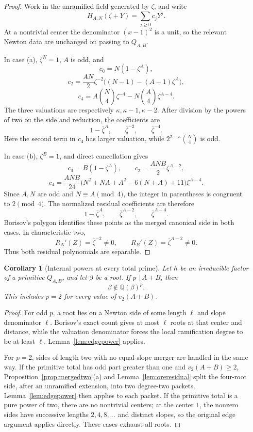 \documentclass[11pt]{article}
\newtheorem{corollary}[theorem]{Corollary}
\theoremstyle{definition}
\newcommand{\Q}{\mathbb Q}
\begin{document}
\begin{proof}
Work in the unramified field generated by \(\zeta\), and write
\[
 H_{A,N}(\zeta+Y)=\sum_{j\geq0}c_jY^j.
\]
At a nontrivial center the denominator \((x-1)^2\) is a unit, so the
relevant Newton data are unchanged on passing to \(Q_{A,B}\).

In case (a), \(\zeta^N=1\), \(A\) is odd, and
\[
 c_0=N(1-\zeta^A),
\]
\[
 c_2=\frac{AN}{2}\zeta^{-2}
       \bigl((N-1)-(A-1)\zeta^A\bigr),
\]
\[
 c_4=A\binom N4\zeta^{-4}
      -N\binom A4\zeta^{A-4}.
\]
The three valuations are respectively
\(\kappa,\kappa-1,\kappa-2\).  After division by the powers of two on the
side and reduction, the coefficients are
\[
 1-\bar\zeta^A,
 \qquad \bar\zeta^{-2},
 \qquad \bar\zeta^{-4}.
\]
Here the second term in \(c_4\) has larger valuation, while
\(2^{2-\kappa}\binom N4\) is odd.

In case (b), \(\zeta^B=1\), and direct cancellation gives
\[
 c_0=B(1-\zeta^A),
 \qquad
 c_2=\frac{ANB}{2}\zeta^{A-2},
\]
\[
 c_4=\frac{ANB}{24}
 \bigl(N^2+NA+A^2-6(N+A)+11\bigr)\zeta^{A-4}.
\]
Since \(A,N\) are odd and \(N\equiv A\pmod4\), the integer in parentheses
is congruent to \(2\pmod4\).  The normalized residual coefficients are
therefore
\[
 1-\bar\zeta^A,
 \qquad \bar\zeta^{A-2},
 \qquad \bar\zeta^{A-4}.
\]
Borisov's polygon identifies these points as the merged canonical side in
both cases.  In characteristic two,
\[
 R_N'(Z)=\bar\zeta^{-2}\neq0,
 \qquad
 R_B'(Z)=\bar\zeta^{A-2}\neq0.
\]
Thus both residual polynomials are separable.
\end{proof}

\begin{corollary}[Internal powers at every total prime]
\label{cor:totalprimepower}
Let \(h\) be an irreducible factor of a primitive \(Q_{A,B}\), and let
\(\beta\) be a root.  If \(p\mid A+B\), then
\[
 \beta\notin\Q(\beta)^p.
\]
This includes \(p=2\) for every value of \(v_2(A+B)\).
\end{corollary}

\begin{proof}
For odd \(p\), a root lies on a Newton side of some length \(\ell\) and
slope denominator \(\ell\).  Borisov's exact count gives at most \(\ell\)
roots at that center and distance, while the valuation denominator forces
the local ramification degree to be at least \(\ell\).
Lemma~\ref{lem:edgepower} applies.

For \(p=2\), sides of length two with no equal-slope merger are handled in
the same way.  If the primitive total has odd part greater than one and
\(v_2(A+B)\geq2\), Proposition~\ref{prop:mergedtwo}(a) and
Lemma~\ref{lem:oreresidual} split the four-root side, after an unramified
extension, into two degree-two packets.  Lemma~\ref{lem:edgepower} then
applies to each packet.  If the primitive total is a pure power of two,
there are no nontrivial centers; at the center \(1\), the nonzero sides have
successive lengths \(2,4,8,\ldots\) and distinct slopes, so the original
edge argument applies directly.  These cases exhaust all roots.
\end{proof}
\end{document}
